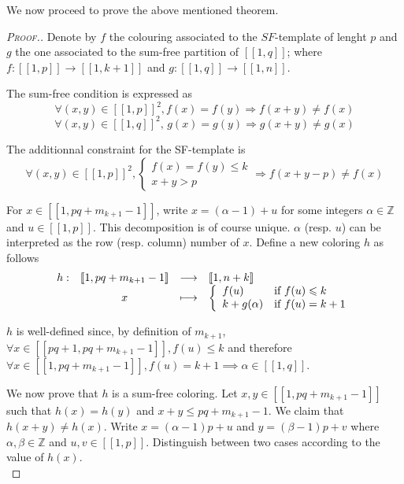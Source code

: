 \begin{center}
\setlength{\tabcolsep}{6pt}
\end{center}

\resetarraystretch

We now proceed to prove the above mentioned theorem.\\

\begin{proof}[\textsc{Proof.}]
Denote by \(f\) the colouring associated to the \(SF\)-template of lenght \(p\) and \(g\) the one associated 
to the sum-free partition of \([\![1,q]\!]\); where \(f : [\![1,p]\!] \longrightarrow [\![1,k+1]\!]\) and 
\(g : [\![1,q]\!] \longrightarrow [\![1,n]\!]\).

\par
The sum-free condition is expressed as
\[\forall (x,y) \in [\![1,p]\!]^2, f(x) = f(y) \Longrightarrow f(x+y) \neq f(x)\]
\[\forall (x,y) \in [\![1,q]\!]^2 \text{, } g(x) = g(y) \Longrightarrow g(x+y) \neq g(x)\]

The additionnal constraint for the SF-template is
\[
\forall (x,y) \in [\![1,p]\!]^2, \left\{
\begin{array}{ll}
	f(x) = f(y) \leqslant k \\
	x + y > p
\end{array}
\right. \Longrightarrow f(x+y-p) \neq f(x)
\]

For \(x \in [\![1,pq+m_{k+1}-1]\!]\), write \(x = (\alpha - 1) + u\) for some integers \(\alpha \in \mathbb{Z}\) and 
\(u \in [\![1,p]\!]\). This decomposition is of course unique. \(\alpha\) (resp. \(u\)) can be interpreted as the row 
(resp. column) number of \(x\). Define a new coloring \(h\) as follows
\[
\begin{array}{c c c l}
	h : & [\![1,pq+m_{k+1}-1]\!] & \longrightarrow & [\![1,n+k]\!] \\
	& x & \longmapsto & 
	\left\{ \begin{array}{l l}
		f(u) & \text{if}~f(u) \leqslant k \\
		k + g(\alpha) & \text{if}~f(u) = k + 1 \\
	\end{array} \right.
\end{array}
\]

\(h\) is well-defined since, by definition of \(m_{k+1}\), \(\forall x \in [\![p q + 1, p q + m_{k + 1} - 1 ]\!], f(u) 
\leqslant k\) and therefore \(\forall x \in [\![1,pq+m_{k+1}-1]\!], f(u) = k + 1 \implies \alpha \in [\![1, q]\!]\).

\par
We now prove that \(h\) is a sum-free coloring. Let \(x,y \in [\![1,pq + m_{k+1}-1]\!]\) such that \(h(x) = h(y)\) 
and \(x+y \leqslant pq+m_{k+1}-1\). We claim that \(h(x+y) \neq h(x)\). Write \(x = (\alpha - 1) p + u\) and 
\(y = (\beta - 1) p + v\) where \(\alpha, \beta \in \mathbb{Z}\) and \(u, v \in [\![1,p]\!]\). Distinguish between 
two cases according to the value of \(h(x)\). \\


\end{proof}
